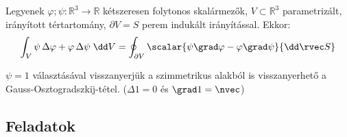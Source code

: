\documentclass[a4paper, 12pt]{scrartcl}
\begin{document}
\begin{theorem}
  Legyenek $\varphi; \psi: \mathbb R^3 \rightarrow \mathbb R$ kétszeresen
  folytonos skalármezők, $V \subset \mathbb R^3$ parametrizált, irányított
  tértartomány, $\partial V = S$ perem indukált irányítással. Ekkor:
  \[
    \int_V
    \psi \, \Delta \varphi + \varphi \, \Delta \psi
    \; \dd V
    =
    \oint_{\partial V}
    \scalar{\psi \grad \varphi - \varphi \grad \psi}{\dd \rvec S}
  \]
\end{theorem}

\begin{note}
  $\psi = 1$ választásával visszanyerjük a szimmetrikus alakból is
  visszanyerhető a Gauss-Osztogradszkij-tétel.
  ($\Delta 1 = 0$ és $\grad 1 = \nvec$)
\end{note}

\clearpage
\subsection{Feladatok}
\end{document}

